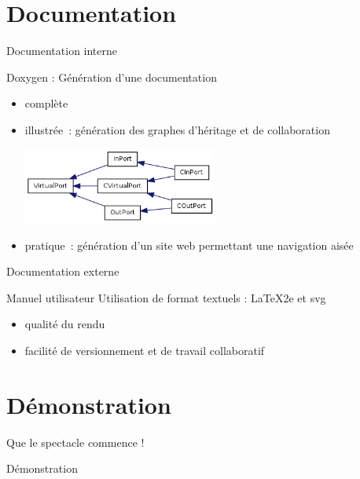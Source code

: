 \documentclass[frenchb]{beamer}
\begin{document}
\section{Documentation}

\begin{frame}{Documentation interne}
    \begin{block}{Doxygen : Génération d'une documentation}
            \begin{itemize}
                \item complète 
                \item illustrée~: génération des graphes d'héritage et de collaboration
                \begin{center}
                    \includegraphics[height=2.5cm]{../img/png/inheritVirtualPort}
                \end{center}
                \item pratique~: génération d'un site web permettant une navigation aisée
            \end{itemize}
     \end{block}
\end{frame}

\begin{frame}{Documentation externe}
     \begin{block}{Manuel utilisateur}
        Utilisation de format textuels : \LaTeX2e{} et svg
        \begin{itemize}
            \item qualité du rendu
            \item facilité de versionnement et de travail collaboratif
        \end{itemize}
     \end{block}
\end{frame}

\section{Démonstration}

\begin{frame}{Que le spectacle commence !}
    \begin{center}
        Démonstration
    \end{center}
\end{frame}
\end{document}
